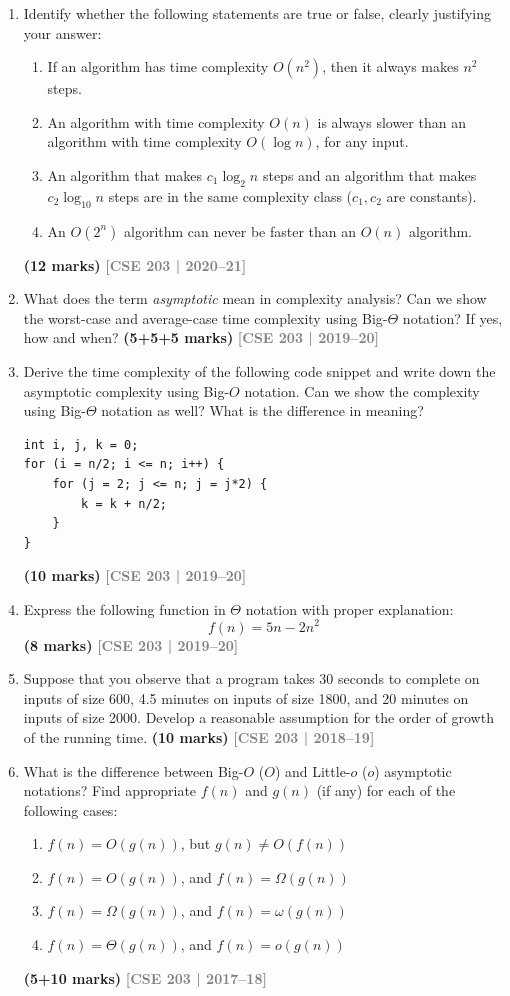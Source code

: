 \documentclass[12pt,a3paper]{article}
\newcommand{\yr}[1]{\hfill\textcolor{gray}{\small\textbf{[#1]}}}
\newcommand{\mk}[1]{\textcolor{orange!70!black}{\small\textbf{(#1 marks)}}}
\begin{document}
\begin{enumerate}
\item Identify whether the following statements are true or false, clearly justifying your answer:
\begin{enumerate}
  \item If an algorithm has time complexity $O(n^2)$, then it always makes $n^2$ steps.
  \item An algorithm with time complexity $O(n)$ is always slower than an algorithm with time complexity $O(\log n)$, for any input.
  \item An algorithm that makes $c_1 \log_2 n$ steps and an algorithm that makes $c_2 \log_{10} n$ steps are in the same complexity class ($c_1, c_2$ are constants).
  \item An $O(2^n)$ algorithm can never be faster than an $O(n)$ algorithm.
\end{enumerate}
\mk{12}
\yr{CSE 203 | 2020--21}

\item What does the term \textit{asymptotic} mean in complexity analysis? Can we show the worst-case and average-case time complexity using Big-$\Theta$ notation? If yes, how and when? \mk{5+5+5}
\yr{CSE 203 | 2019--20}

\item Derive the time complexity of the following code snippet and write down the asymptotic complexity using Big-$O$ notation. Can we show the complexity using Big-$\Theta$ notation as well? What is the difference in meaning?
\begin{verbatim}
int i, j, k = 0;
for (i = n/2; i <= n; i++) {
    for (j = 2; j <= n; j = j*2) {
        k = k + n/2;
    }
}
\end{verbatim}
\mk{10}
\yr{CSE 203 | 2019--20}

\item Express the following function in $\Theta$ notation with proper explanation:
\[ f(n) = 5n - 2n^2 \]
\mk{8}
\yr{CSE 203 | 2019--20}

\item Suppose that you observe that a program takes 30 seconds to complete on inputs of size 600, 4.5 minutes on inputs of size 1800, and 20 minutes on inputs of size 2000. Develop a reasonable assumption for the order of growth of the running time. \mk{10}
\yr{CSE 203 | 2018--19}

\item What is the difference between Big-$O$ ($O$) and Little-$o$ ($o$) asymptotic notations? Find appropriate $f(n)$ and $g(n)$ (if any) for each of the following cases:
\begin{enumerate}
  \item $f(n) = O(g(n))$, but $g(n) \neq O(f(n))$
  \item $f(n) = O(g(n))$, and $f(n) = \Omega(g(n))$
  \item $f(n) = \Omega(g(n))$, and $f(n) = \omega(g(n))$
  \item $f(n) = \Theta(g(n))$, and $f(n) = o(g(n))$
\end{enumerate}
\mk{5+10}
\yr{CSE 203 | 2017--18}


\end{enumerate}
\end{document}

